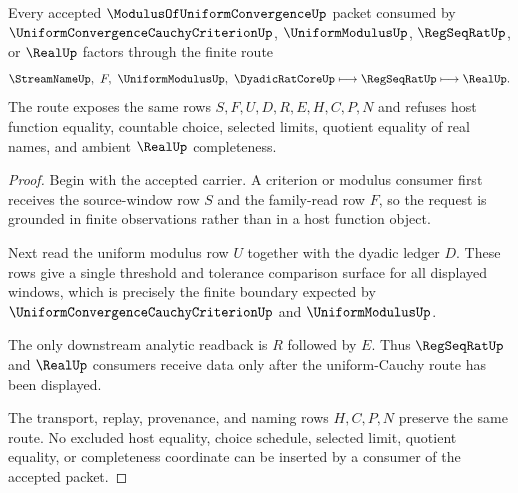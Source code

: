 \begin{theorem}
\label{thm:modulus-of-uniform-convergence-cauchy-uniform-route}
Every accepted $\ModulusOfUniformConvergenceUp$ packet consumed by $\UniformConvergenceCauchyCriterionUp$, $\UniformModulusUp$, $\RegSeqRatUp$, or $\RealUp$ factors through the finite route
$$
\StreamNameUp,\ F,\ \UniformModulusUp,\ \DyadicRatCoreUp
\longmapsto
\RegSeqRatUp
\longmapsto
\RealUp .
$$
The route exposes the same rows $S,F,U,D,R,E,H,C,P,N$ and refuses host function equality, countable choice, selected limits, quotient equality of real names, and ambient $\RealUp$ completeness.
\end{theorem}
\begin{proof}
Begin with the accepted carrier. A criterion or modulus consumer first receives the source-window row $S$ and the family-read row $F$, so the request is grounded in finite observations rather than in a host function object.

Next read the uniform modulus row $U$ together with the dyadic ledger $D$. These rows give a single threshold and tolerance comparison surface for all displayed windows, which is precisely the finite boundary expected by $\UniformConvergenceCauchyCriterionUp$ and $\UniformModulusUp$.

The only downstream analytic readback is $R$ followed by $E$. Thus $\RegSeqRatUp$ and $\RealUp$ consumers receive data only after the uniform-Cauchy route has been displayed.

The transport, replay, provenance, and naming rows $H,C,P,N$ preserve the same route. No excluded host equality, choice schedule, selected limit, quotient equality, or completeness coordinate can be inserted by a consumer of the accepted packet.
\end{proof}



